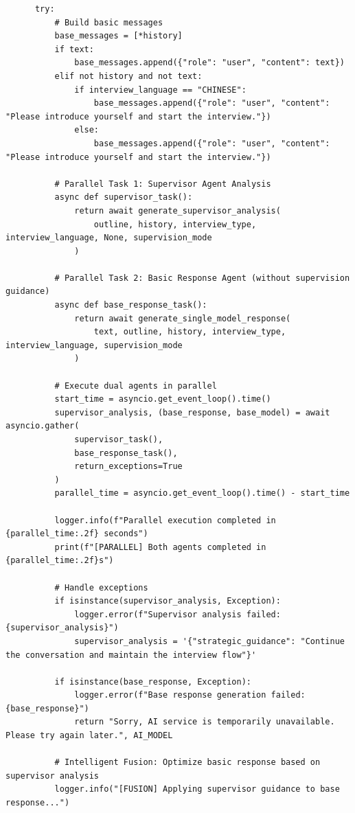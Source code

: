 \documentclass[sigchi,nonacm,manuscript]{acmart}
\begin{document}
\begin{lstlisting}
      try:
          # Build basic messages
          base_messages = [*history]
          if text:
              base_messages.append({"role": "user", "content": text})
          elif not history and not text:
              if interview_language == "CHINESE":
                  base_messages.append({"role": "user", "content": "Please introduce yourself and start the interview."})
              else:
                  base_messages.append({"role": "user", "content": "Please introduce yourself and start the interview."})
          
          # Parallel Task 1: Supervisor Agent Analysis
          async def supervisor_task():
              return await generate_supervisor_analysis(
                  outline, history, interview_type, interview_language, None, supervision_mode
              )
          
          # Parallel Task 2: Basic Response Agent (without supervision guidance)
          async def base_response_task():
              return await generate_single_model_response(
                  text, outline, history, interview_type, interview_language, supervision_mode
              )
          
          # Execute dual agents in parallel
          start_time = asyncio.get_event_loop().time()
          supervisor_analysis, (base_response, base_model) = await asyncio.gather(
              supervisor_task(),
              base_response_task(),
              return_exceptions=True
          )
          parallel_time = asyncio.get_event_loop().time() - start_time
          
          logger.info(f"Parallel execution completed in {parallel_time:.2f} seconds")
          print(f"[PARALLEL] Both agents completed in {parallel_time:.2f}s")
          
          # Handle exceptions
          if isinstance(supervisor_analysis, Exception):
              logger.error(f"Supervisor analysis failed: {supervisor_analysis}")
              supervisor_analysis = '{"strategic_guidance": "Continue the conversation and maintain the interview flow"}'
          
          if isinstance(base_response, Exception):
              logger.error(f"Base response generation failed: {base_response}")
              return "Sorry, AI service is temporarily unavailable. Please try again later.", AI_MODEL
          
          # Intelligent Fusion: Optimize basic response based on supervisor analysis
          logger.info("[FUSION] Applying supervisor guidance to base response...")
          

\end{lstlisting}
\end{document}
